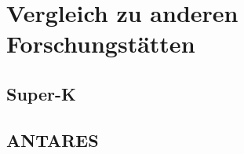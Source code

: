 \chapter{Vergleich zu anderen Forschungstätten} 
    \vspace{8pt}
    \section{Super-K}
    \section{ANTARES}